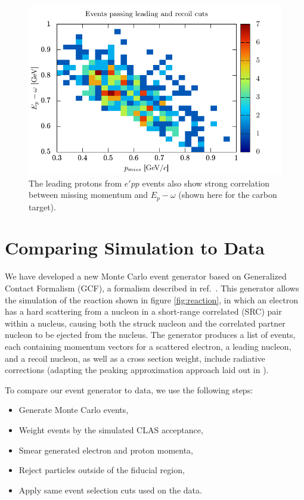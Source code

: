 \documentclass{article}
\begin{document}
\begin{figure}[htpb]
\centering
\includegraphics{pmiss_e1_epp.pdf}
\caption[Two proton $p_\text{miss}$ vs. $E_1$]{
The leading protons from $e'pp$ events also show strong correlation 
between missing momentum and $E_p - \omega$ (shown here for the carbon target).
\label{fig:epp_pm_e1}}
\end{figure}


\section{Comparing Simulation to Data}
\label{sec:comp}

We have developed a new Monte Carlo event generator based on Generalized Contact
Formalism (GCF), a formalism described in ref.~\cite{weiss:2016obx}. 
This generator allows the simulation of the reaction shown in figure \ref{fig:reaction}, 
in which an electron has a hard scattering from a nucleon in a short-range correlated (SRC)
pair within a nucleus, causing both the struck nucleon and the correlated partner nucleon
to be ejected from the nucleus. The generator produces a list of events, each containing 
momentum vectors for a scattered electron, a leading nucleon, and a recoil nucleon, as 
well as a cross section weight, include radiative corrections
(adapting the peaking approximation approach laid out in \cite{Ent:2001hm}).

To compare our event generator to data, we use the following steps:
\begin{itemize}
\item Generate Monte Carlo events,
\item Weight events by the simulated CLAS acceptance,
\item Smear generated electron and proton momenta,
\item Reject particles outside of the fiducial region,
\item Apply same event selection cuts used on the data.
\end{itemize}
\end{document}
